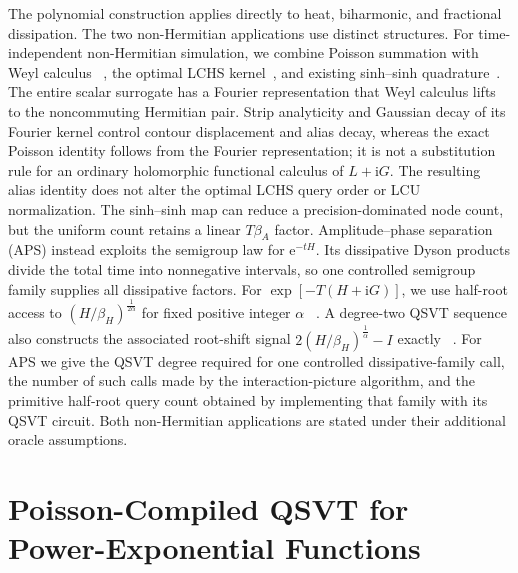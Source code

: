 \documentclass[aps,pra,reprint,floatfix,unsortedaddress,superscriptaddress]{revtex4-2}
\begin{document}
The polynomial construction applies directly to heat, biharmonic, and
fractional dissipation.  The two non-Hermitian applications use distinct
structures.  For time-independent non-Hermitian simulation, we combine
Poisson summation with Weyl calculus
~\cite{ni2026quantumeigenvaluetransformationlinear,
weyl1950theory,anderson1969weyl,jefferies2004spectral}, the optimal LCHS
kernel~\cite{PhysRevLett.131.150603,
an2023quantumalgorithmlinearnonunitary,
low2025optimalquantumsimulationlinear}, and existing sinh--sinh
quadrature~\cite{aftab2026lchsmpf}.  The entire scalar surrogate has a
Fourier representation that Weyl calculus lifts to the noncommuting
Hermitian pair.  Strip analyticity and Gaussian decay of its Fourier
kernel control contour displacement and alias decay, whereas the exact
Poisson identity follows from the Fourier representation; it is not a
substitution rule for an ordinary holomorphic functional calculus of
$L+\mathrm iG$.  The resulting alias
identity does not alter the optimal LCHS query order or LCU
normalization.  The sinh--sinh map can reduce a precision-dominated node
count, but the uniform count retains a linear $T\beta_A$ factor.
Amplitude--phase separation (APS) instead exploits the semigroup law for
$\mathrm e^{-tH}$.  Its dissipative Dyson products divide the total time
into nonnegative intervals, so one controlled semigroup family supplies
all dissipative factors.  For $\exp[-T(H+\mathrm iG)]$, we use half-root
access to
$(H/\beta_H)^{\frac{1}{2\alpha}}$ for fixed positive integer $\alpha$
~\cite{hu2026quantumsimulationnonunitarydynamics}.  A degree-two QSVT
sequence also constructs the associated root-shift signal
$2(H/\beta_H)^{\frac{1}{\alpha}}-I$ exactly
~\cite{Gilyen2019qsvt}.  For APS we give the QSVT degree required for
one controlled dissipative-family call, the number of such calls made by
the interaction-picture algorithm, and the primitive half-root query
count obtained by implementing that family with its QSVT circuit.
Both non-Hermitian applications are
stated under their additional oracle assumptions.

\section{Poisson-Compiled QSVT for Power-Exponential Functions}
\label{sec:poisson_qsvt}
\end{document}
